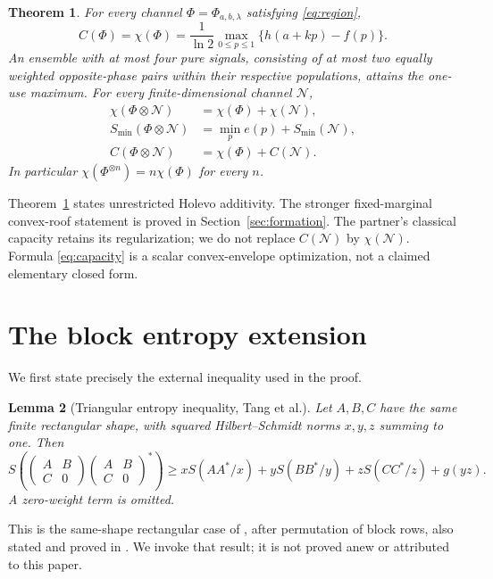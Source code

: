 \documentclass[11pt]{article}
\newtheorem{theorem}{Theorem}
\newtheorem{lemma}[theorem]{Lemma}
\newcommand{\Smin}{S_{\min}}
\begin{document}
\begin{theorem}\label{thm:main}
For every channel $\Phi=\Phi_{a,b,\lambda}$ satisfying \eqref{eq:region},
\begin{equation}\label{eq:capacity}
 C(\Phi)=\chi(\Phi)=\frac1{\ln2}\max_{0\le p\le1}
       \{h(a+kp)-f(p)\}.
\end{equation}
An ensemble with at most four pure signals, consisting of at most two equally weighted opposite-phase pairs within their respective populations, attains the one-use maximum. For every finite-dimensional channel $\mathcal N$,
\begin{align}
 \chi(\Phi\otimes\mathcal N)&=\chi(\Phi)+\chi(\mathcal N),\label{eq:chiadd}\\
 \Smin(\Phi\otimes\mathcal N)&=\min_p e(p)+\Smin(\mathcal N),\label{eq:sadd}\\
 C(\Phi\otimes\mathcal N)&=\chi(\Phi)+C(\mathcal N).\label{eq:cadd}
\end{align}
In particular $\chi(\Phi^{\otimes n})=n\chi(\Phi)$ for every $n$.
\end{theorem}
Theorem~\ref{thm:main} states unrestricted Holevo additivity. The stronger fixed-marginal convex-roof statement is proved in Section~\ref{sec:formation}. The partner's classical capacity retains its regularization; we do not replace $C(\mathcal N)$ by $\chi(\mathcal N)$. Formula \eqref{eq:capacity} is a scalar convex-envelope optimization, not a claimed elementary closed form.

\section{The block entropy extension}
We first state precisely the external inequality used in the proof.

\begin{lemma}[Triangular entropy inequality, Tang et al.]\label{lem:triangular}
Let $A,B,C$ have the same finite rectangular shape, with squared Hilbert--Schmidt norms $x,y,z$ summing to one. Then
\[
 S\left(
 \begin{pmatrix}A&B\\C&0\end{pmatrix}
 \begin{pmatrix}A&B\\C&0\end{pmatrix}^{\!*}\right)
 \ge xS(AA^*/x)+yS(BB^*/y)+zS(CC^*/z)+g(yz).
\]
A zero-weight term is omitted.
\end{lemma}
This is the same-shape rectangular case of \cite[Theorem 4.2]{tang}, after permutation of block rows, also stated and proved in \cite[Theorem 2.1]{openai}. We invoke that result; it is not proved anew or attributed to this paper.
\end{document}
